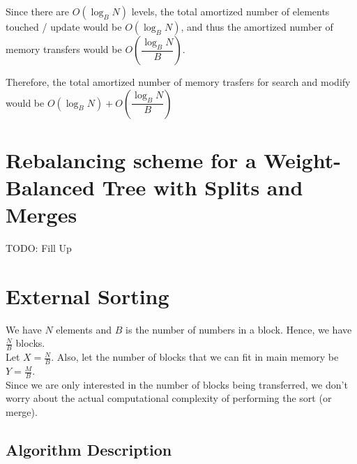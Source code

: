 \documentclass{article}
\begin{document}
Since there are $O(\log_B{N})$ levels, the total amortized number of elements 
touched / update would be $O(\log_B{N})$, and thus the amortized number of memory transfers
would be $O\left(\dfrac{\log_B{N}}{B}\right)$.

Therefore, the total amortized number of memory trasfers for search and modify would
be $O(\log_B{N}) + O\left(\dfrac{\log_B{N}}{B}\right)$
\clearpage

\section {Rebalancing scheme for a Weight-Balanced Tree with Splits and Merges}
TODO: Fill Up

\clearpage

\section{External Sorting}

We have $N$ elements and $B$ is the number of numbers in a
block. Hence, we have $\frac{N}{B}$ blocks.\\ Let $X =
\frac{N}{B}$. Also, let the number of blocks that we can fit in main
memory be $Y = \frac{M}{B}$.
\\
Since we are only interested in the number of blocks being
transferred, we don't worry about the actual computational complexity
of performing the sort (or merge).\\

\subsection{Algorithm Description}
\end{document}
